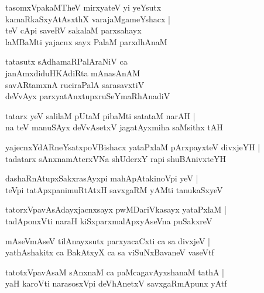 \begin{shloka}
tasomxVpakaMTheV mirxyateV yi yeYsutx\\
kamaRkaSxyAtAsxthX varajaMgameYshacx |\\
teV cApi saveRV sakalaM parxsahayx\\
laMBaMti yajacnx sayx PalaM parxdhAnaM
\end{shloka}

\begin{shloka}
tatasutx sAdhamaRPalAraNiV ca \\
janAmxdiduHKAdiRta mAnasAnAM \\
savARtamxnA ruciraPalA sarasavxtiV\\
deVvAyx parxyatAnxtupxruSeYmaRhAnadiV 
\end{shloka}

\begin{shloka}
tatarx yeV salilaM pUtaM pibaMti satataM narAH |\\
na teV manuSAyx deVvAsetxV jagatAyxmiha saMsithx tAH 
\end{shloka}

\begin{shloka}
yajecnxYdARneYsatxpoVBishacx yataPxlaM pArxpayxteV divxjeYH |\\
tadatarx sAnxnamAterxVNa shUderxY rapi shuBAnivxteYH 
\end{shloka}

\begin{shloka}
dashaRnAtupxSakxrasAyxpi mahApAtakinoVpi yeV |\\
teVpi tatApxpanimuRtAtxH savxgaRM yAMti tanukaSxyeV
\end{shloka}

\begin{shloka}
tatorxVpavAsAdayxjacnxsayx pwMDariVkasayx yataPxlaM |\\
tadAponxVti naraH kiSxparxmalApxyAseVna puSakxreV
\end{shloka}

\begin{shloka}
mAseVmAseV tilAnayxsutx parxyacaCxti ca sa divxjeV |\\
yathAshakitx ca BakAtxyX ca sa viSuNxBavaneV vaseVtf
\end{shloka}

\begin{shloka}
tatotxVpavAsaM sAnxnaM ca paMcagavAyxshanaM tathA |\\
yaH karoVti narasosxVpi deVhAnetxV savxgaRmApunx yAtf
\end{shloka}

